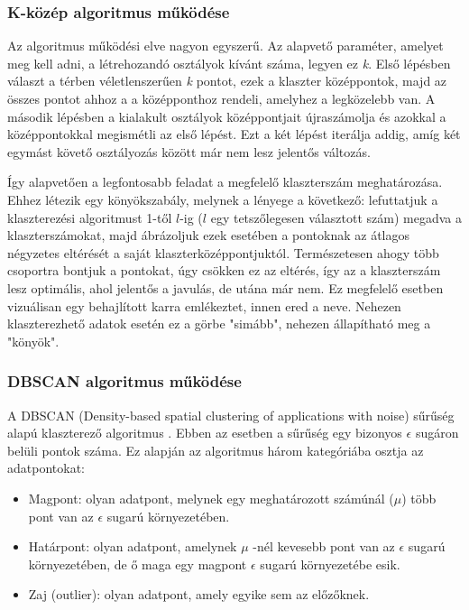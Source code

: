 \documentclass[12pt]{article}
\begin{document}
\subsubsection{K-közép algoritmus működése}
Az algoritmus működési elve nagyon egyszerű. Az alapvető paraméter, amelyet meg kell adni, a létrehozandó osztályok kívánt száma, legyen ez \textit{k}. Első lépésben választ a térben véletlenszerűen \textit{k} pontot, ezek a klaszter középpontok, majd az összes pontot ahhoz a a középponthoz rendeli, amelyhez a legközelebb van. A második lépésben a kialakult osztályok középpontjait újraszámolja és azokkal a középpontokkal megismétli az első lépést. Ezt a két lépést iterálja addig, amíg két egymást követő osztályozás között már nem lesz jelentős változás.

Így alapvetően a legfontosabb feladat a megfelelő klaszterszám meghatározása. Ehhez létezik egy könyökszabály, melynek a lényege a következő: lefuttatjuk a klaszterezési algoritmust 1-től $l$-ig ($l$ egy tetszőlegesen választott szám) megadva a klaszterszámokat, majd ábrázoljuk ezek esetében a pontoknak az átlagos négyzetes eltérését a saját klaszterközéppontjuktól. Természetesen ahogy több csoportra bontjuk a pontokat, úgy csökken ez az eltérés, így az a klaszterszám lesz optimális, ahol jelentős a javulás, de utána már nem. Ez megfelelő esetben vizuálisan egy behajlított karra emlékeztet, innen ered a neve. Nehezen klaszterezhető adatok esetén ez a görbe "simább", nehezen állapítható meg a "könyök".

\subsubsection{DBSCAN algoritmus működése}

A DBSCAN (Density-based spatial clustering of applications with noise) sűrűség alapú klaszterező algoritmus \cite{dbscan}. Ebben az esetben a sűrűség egy bizonyos $\epsilon$ sugáron belüli pontok száma. Ez alapján az algoritmus három kategóriába osztja az adatpontokat:
\begin{itemize}
\item Magpont: olyan adatpont, melynek egy meghatározott számúnál ($\mu$) több pont van az $\epsilon$ sugarú környezetében.
\item Határpont: olyan adatpont, amelynek $\mu$ -nél kevesebb pont van az $\epsilon$ sugarú környezetében, de ő maga egy magpont $\epsilon$ sugarú környezetébe esik.
\item Zaj (outlier): olyan adatpont, amely egyike sem az előzőknek.
\end{itemize}
\end{document}
